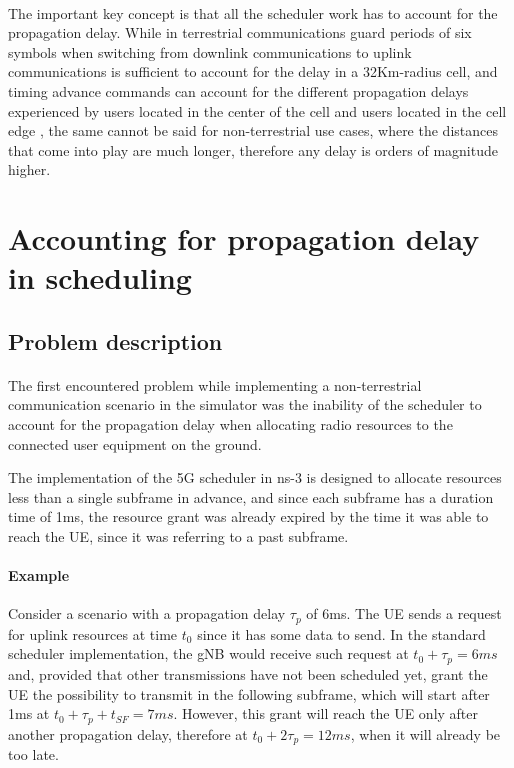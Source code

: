 \paragraph{}The important key concept is that all the scheduler work has to account for the propagation delay. While in terrestrial communications guard periods of six symbols when switching from downlink communications to uplink communications is sufficient to account for the delay in a 32Km-radius cell, and timing advance commands can account for the different propagation delays experienced by users located in the center of the cell and users located in the cell edge \cite{gsma-5g-tdd-sync}, the same cannot be said for non-terrestrial use cases, where the distances that come into play are much longer, therefore any delay is orders of magnitude higher.

\section{Accounting for propagation delay in scheduling}
\label{sec:pd-sched-acc}

\subsection{Problem description}
\label{ss:propdelay-problem-desc}
\paragraph{}
The first encountered problem while implementing a non-terrestrial communication scenario in the simulator was the inability of the scheduler to account for the propagation delay when allocating radio resources to the connected user equipment on the ground.

The implementation of the 5G scheduler in ns-3 is designed to allocate resources less than a single subframe in advance, and since each subframe has a duration time of 1ms, the resource grant was already expired by the time it was able to reach the \ac{UE}, since it was referring to a past subframe.

\paragraph{Example} Consider a scenario with a propagation delay $\tau_p$ of 6ms. The \ac{UE} sends a request for uplink resources at time $t_0$ since it has some data to send. In the standard scheduler implementation, the \ac{gNB} would receive such request at $t_0+\tau_p=6\textit{ms}$ and, provided that other transmissions have not been scheduled yet, grant the \ac{UE} the possibility to transmit in the following subframe, which will start after 1ms at $t_0+\tau_p+t_{\textit{SF}}=7\textit{ms}$. However, this grant will reach the \ac{UE} only after another propagation delay, therefore at $t_0+2\tau_p=12\textit{ms}$, when it will already be too late.

